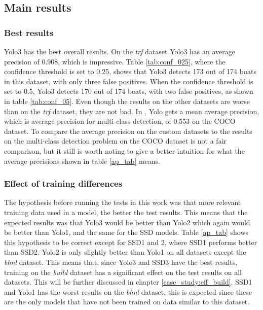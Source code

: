 \vspace{3mm}


\subsection{Main results}
\label{subsec:main}

\subsubsection{Best results}
Yolo3 has the best overall results. On the \textit{trf} dataset Yolo3 has an average precision of 0.908, which is impressive. Table \ref{tab:conf_025}, where the confidence threshold is set to 0.25, shows that Yolo3 detects 173 out of 174 boats in this dataset, with only three false positives. When the confidence threshold is set to 0.5, Yolo3 detects 170 out of 174 boats, with two false positives, as shown in table \ref{tab:conf_05}. Even though the results on the other datasets are worse than on the \textit{trf} dataset, they are not bad. In \citep{YOLOv3}, Yolo gets a mean average precision, which is average precision for multi-class detection, of 0.553 on the COCO dataset. To compare the average precision on the custom datasets to the results on the multi-class detection problem on the COCO dataset is not a fair comparison, but it still is worth noting to give a better intuition for what the average precisions shown in table \ref{ap_tab} means. 

\subsubsection{Effect of training differences}
The hypothesis before running the tests in this work was that more relevant training data used in a model, the better the test results. This means that the expected results was that Yolo3 would be better than Yolo2 which again would be better than Yolo1, and the same for the SSD models. Table \ref{ap_tab} shows this hypothesis to be correct except for SSD1 and 2, where SSD1 performs better than SSD2. Yolo2 is only slightly better than Yolo1 on all datasets except the \textit{bhnl} dataset. This means that, since Yolo3 and SSD3 have the best results, training on the \textit{build} dataset has a significant effect on the test results on all datasets. This will be further discussed in chapter \ref{case_study:eff_build}. SSD1 and Yolo1 has the worst results on the \textit{bhnl} dataset, this is expected since these are the only models that have not been trained on data similar to this dataset.

